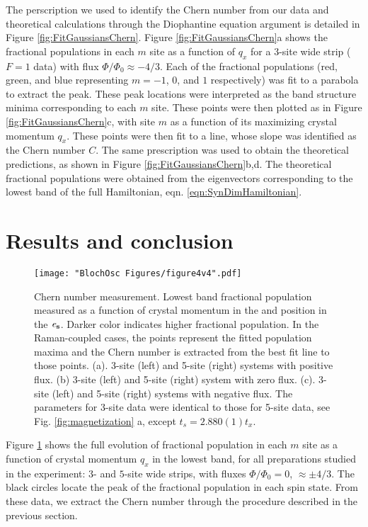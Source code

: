 The perscription we used to identify the Chern number from our data and theoretical calculations through the Diophantine equation argument is detailed in Figure \ref{fig:FitGaussiansChern}. Figure \ref{fig:FitGaussiansChern}a shows the fractional populations in each $m$ site as a function of $q_x$ for a $3$-site wide strip ($F=1$ data) with flux $\Phi/\Phi_0\approx-4/3$. Each of the fractional populations (red, green, and blue representing $m=-1$, $0$, and $1$ respectively) was fit to a parabola to extract the peak. These peak locations were interpreted as the band structure minima corresponding to each $m$ site. These points were then plotted as in Figure \ref{fig:FitGaussiansChern}c, with site $m$ as a function of its maximizing crystal momentum $q_x$. These points were then fit to a line, whose slope was identified as the Chern number $C$. The same prescription was used to obtain the theoretical predictions, as shown in Figure \ref{fig:FitGaussiansChern}b,d. The theoretical fractional populations were obtained from the eigenvectors corresponding to the lowest band of the full Hamiltonian, eqn. \ref{eqn:SynDimHamiltonian}. 

\section{Results and conclusion}

\begin{figure}
\texttt{[image: "BlochOsc Figures/figure4v4".pdf]}
\caption[Chern number measurement] {Chern number measurement. Lowest band fractional population measured as a function of crystal momentum in the  \ex  and position in the $\bf{\mathit{e}_s}$. Darker color indicates higher fractional population. In the Raman-coupled cases, the points represent the fitted population maxima and the Chern number is extracted from the best fit line to those points.  (a). 3-site (left) and 5-site (right) systems with positive flux.  (b) 3-site (left) and 5-site (right) system with zero flux.  (c). 3-site (left) and 5-site (right) systems with negative flux. The parameters for 3-site data were identical to those for 5-site data, see Fig. \ref{fig:magnetization} a, except $t_s =2.880(1)t_x$.}
\label{fig:finalData}
\end{figure}

Figure \ref{fig:finalData} shows the full evolution of fractional population in each $m$ site as a function of crystal momentum $q_x$ in the lowest band, for all preparations studied in the experiment: $3$- and $5$-site wide strips, with fluxes $\Phi/\Phi_0 = 0$, $\approx\pm 4/3$.   The black circles locate the peak of the fractional population in each spin state. From these data, we extract the Chern number through the procedure described in the previous section.

